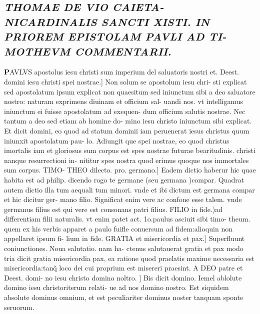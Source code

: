\documentclass{article}
\begin{document}
\begin{pages}
\subsection*{\textit{THOMAE DE VIO CAIETA- NICARDINALIS SANCTI XISTI. IN PRIOREM EPISTOLAM PAVLI AD TI- MOTHEVM COMMENTARII. }}\pstart \huge\textbf{P}\normalsize AVLVS apostolus iesu christi sum imperium del saluatoris nostri et. Deest. domini iesu christi spei nostrae.] Non solum se apostolum iesu chri- sti explicat sed apostolatum ipsum explicat non quaesitum sed iniunctum sibi a deo saluatore nostro: naturam exprimens diuinam et officium sal- uandi nos. vt intelligamus iniunctum ei fuisse apostolatum ad exequen- dum officium salutis nostrae. Nec tantum a deo sed etiam ab homine do- mino iesu christo iniunctum sibi explicat. Et dicit domini, eo quod ad statum dominii iam peruenerat iesus christus quum iniunxit apostolatum pau- lo. Adiungit que spei nostrae, eo quod christus imortalis iam et gloriosus sum corpus est spes nostrae futurae bearitudinis. christi nanque resurrectioni in- nititur spes nostra quod erimus quoque nos immortales sum corpus. TIMO- THEO dilecto. pro. germano.] Eadem dictio haberur hic quae habita est ad philip. dicendo rogo te germane (seu germana )compar. Quadrat autem dictio illa tum aequali tum minori. vnde et ibi dictum est germana compar et hic dicitur ger- mano filio. Significat enim vere ac confone esse talem. vnde germanus filius est qui vere est consonans patri filius. FILIO in fide.)ad differentiam filii naturalis. vt enim patet act. 1o.paulus asciuit sibi timo- theum. quem ex his verbis apparet a paulo fuifle conuersum ad fidem:alioquin non appellaret ipsum fi- lium in fide. GRATIA et misericordia et pax.] Superfluunt coniunctiones. Noua salutatio. nam ha- ctenus salutauerat gratia et pax modo tria dicit gratia misericordia pax, ea ratione quod praelatis maxime necessaria est misericordia:tanq̃ loco dei cui proprium est misereri praesint. A DEO patre et Deest. domi- no iesu christo domino noltro. ] Bis dicit domino. Iemel ablolute domino iesu christoriterum relati- ue ad nos domino nostro. Est siquidem absolute dominus omnium, et est peculiariter dominus noster tanquam sponte seruorum.  \pend

\end{pages}
\end{document}
